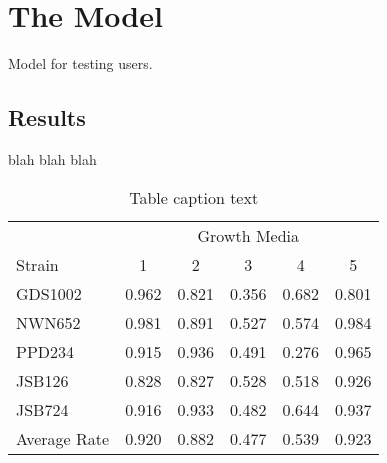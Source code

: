 \documentclass[a4paper, 11pt]{article}
\begin{document}
\section{The Model} \label{sec:Model}

Model for testing users. 



\subsection{Results}
blah blah blah
\begin{table}[ht]
\centering 
\begin{tabular}{l c c c c c} %
& \multicolumn{5}{c}{Growth Media} \\ %
Strain & 1 & 2 & 3 & 4 & 5\\ %
GDS1002 & 0.962 & 0.821 & 0.356 & 0.682 & 0.801\\ %
NWN652 & 0.981 & 0.891 & 0.527 & 0.574 & 0.984\\ %
PPD234 & 0.915 & 0.936 & 0.491 & 0.276 & 0.965\\ %
JSB126 & 0.828 & 0.827 & 0.528 & 0.518 & 0.926\\ %
JSB724 & 0.916 & 0.933 & 0.482 & 0.644 & 0.937\\ %


Average Rate & 0.920 & 0.882 & 0.477 & 0.539 & 0.923\\ %

\end{tabular}
\caption{Table caption text}
\end{table}
\end{document}
